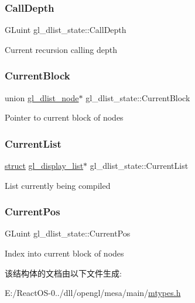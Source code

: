 \subsubsection{\texorpdfstring{Call\+Depth}{CallDepth}}
{\footnotesize\ttfamily G\+Luint gl\+\_\+dlist\+\_\+state\+::\+Call\+Depth}

Current recursion calling depth \mbox{\label{structgl__dlist__state_acf61ddd3ff8183981b8a90f3f8a1234f}} 
\subsubsection{\texorpdfstring{Current\+Block}{CurrentBlock}}
{\footnotesize\ttfamily union \hyperlink{uniongl__dlist__node}{gl\+\_\+dlist\+\_\+node}$\ast$ gl\+\_\+dlist\+\_\+state\+::\+Current\+Block}

Pointer to current block of nodes \mbox{\label{structgl__dlist__state_ad49d54087619ca45b768ed4b242092c6}} 
\subsubsection{\texorpdfstring{Current\+List}{CurrentList}}
{\footnotesize\ttfamily \hyperlink{interfacestruct}{struct} \hyperlink{structgl__display__list}{gl\+\_\+display\+\_\+list}$\ast$ gl\+\_\+dlist\+\_\+state\+::\+Current\+List}

List currently being compiled \mbox{\label{structgl__dlist__state_a6a87a383653895dc2bd5c65b13ecc877}} 
\subsubsection{\texorpdfstring{Current\+Pos}{CurrentPos}}
{\footnotesize\ttfamily G\+Luint gl\+\_\+dlist\+\_\+state\+::\+Current\+Pos}

Index into current block of nodes 

该结构体的文档由以下文件生成\+:\begin{DoxyCompactItemize}
\item 
E\+:/\+React\+O\+S-\/0../dll/opengl/mesa/main/\hyperlink{mtypes_8h}{mtypes.\+h}\end{DoxyCompactItemize}
